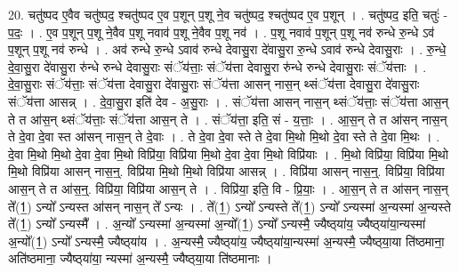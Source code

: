 \documentclass[17pt]{extarticle}
\begin{document}
20. चतु॑ष्पद ए॒वैव चतु॑ष्पद॒ श्चतु॑ष्पद ए॒व प॒शून् प॒शू ने॒व चतु॑ष्पद॒ श्चतु॑ष्पद ए॒व प॒शून् । . चतु॑ष्पद॒ इति॒ चतुः॑ - प॒दः॒ । . ए॒व प॒शून् प॒शू ने॒वैव प॒शू नवाव॑ प॒शू ने॒वैव प॒शू नव॑ । . प॒शू नवाव॑ प॒शून् प॒शू नव॑ रुन्धे रु॒न्धे ऽव॑ प॒शून् प॒शू नव॑ रुन्धे । . अव॑ रुन्धे रु॒न्धे ऽवाव॑ रुन्धे देवासु॒रा दे॑वासु॒रा रु॒न्धे ऽवाव॑ रुन्धे देवासु॒राः । . रु॒न्धे॒ दे॒वा॒सु॒रा दे॑वासु॒रा रु॑न्धे रुन्धे देवासु॒राः संॅय॑त्ताः॒ संॅय॑त्ता देवासु॒रा रु॑न्धे रुन्धे देवासु॒राः संॅय॑त्ताः । . दे॒वा॒सु॒राः संॅय॑त्ताः॒ संॅय॑त्ता देवासु॒रा दे॑वासु॒राः संॅय॑त्ता आसन् नास॒न् थ्संॅय॑त्ता देवासु॒रा दे॑वासु॒राः संॅय॑त्ता आसन्न् । . दे॒वा॒सु॒रा इति॑ देव - अ॒सु॒राः । . संॅय॑त्ता आसन् नास॒न् थ्संॅय॑त्ताः॒ संॅय॑त्ता आस॒न् ते त आ॑स॒न् थ्संॅय॑त्ताः॒ संॅय॑त्ता आस॒न् ते । . संॅय॑त्ता॒ इति॒ सं - य॒त्ताः॒ । . आ॒स॒न् ते त आ॑सन् नास॒न् ते दे॒वा दे॒वा स्त आ॑सन् नास॒न् ते दे॒वाः । . ते दे॒वा दे॒वा स्ते ते दे॒वा मि॒थो मि॒थो दे॒वा स्ते ते दे॒वा मि॒थः । . दे॒वा मि॒थो मि॒थो दे॒वा दे॒वा मि॒थो विप्रि॑या॒ विप्रि॑या मि॒थो दे॒वा दे॒वा मि॒थो विप्रि॑याः । . मि॒थो विप्रि॑या॒ विप्रि॑या मि॒थो मि॒थो विप्रि॑या आसन् नास॒न्॒. विप्रि॑या मि॒थो मि॒थो विप्रि॑या आसन्न् । . विप्रि॑या आसन् नास॒न्॒. विप्रि॑या॒ विप्रि॑या आस॒न् ते त आ॑स॒न्॒. विप्रि॑या॒ विप्रि॑या आस॒न् ते । . विप्रि॑या॒ इति॒ वि - प्रि॒याः॒ । . आ॒स॒न् ते त आ॑सन् नास॒न् ते᳚(1॒) ऽन्यो᳚ ऽन्यस्त आ॑सन् नास॒न् ते᳚ ऽन्यः । . ते᳚(1॒) ऽन्यो᳚ ऽन्यस्ते ते᳚(1॒) ऽन्यो᳚ ऽन्यस्मा॑ अ॒न्यस्मा॑ अ॒न्यस्ते ते᳚(1॒) ऽन्यो᳚ ऽन्यस्मै᳚ । . अ॒न्यो᳚ ऽन्यस्मा॑ अ॒न्यस्मा॑ अ॒न्यो᳚(1॒) ऽन्यो᳚ ऽन्यस्मै॒ ज्यैष्ठ्‍या॑य॒ ज्यैष्ठ्‍या॑या॒न्यस्मा॑ अ॒न्यो᳚(1॒) ऽन्यो᳚ ऽन्यस्मै॒ ज्यैष्ठ्‍या॑य । . अ॒न्यस्मै॒ ज्यैष्ठ्‍या॑य॒ ज्यैष्ठ्‍या॑या॒न्यस्मा॑ अ॒न्यस्मै॒ ज्यैष्ठ्‍या॒या ति॑ष्ठमाना॒ अति॑ष्ठमाना॒ ज्यैष्ठ्‍या॑या॒ न्यस्मा॑ अ॒न्यस्मै॒ ज्यैष्ठ्‍या॒या ति॑ष्ठमानाः । \newline
\end{document}
